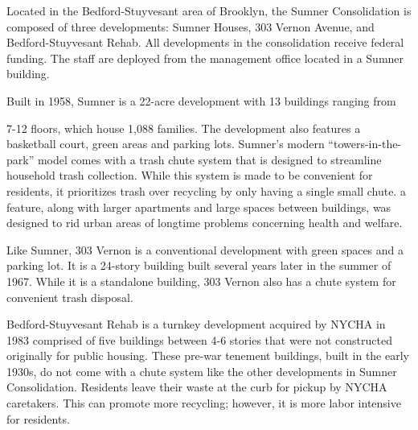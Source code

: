 Located in the Bedford-Stuyvesant area of Brooklyn, the Sumner Consolidation is composed of three developments: Sumner Houses, 303 Vernon Avenue, and Bedford-Stuyvesant Rehab. All developments in the consolidation receive federal funding. The staff are deployed from the management office located in a Sumner building.

 Built in 1958, Sumner is a 22-acre development with 13 buildings ranging from

7-12 floors, which house 1,088 families. The development also features a basketball court, green areas and parking lots. Sumner's modern ``towers-in-the-park'' model comes with a trash chute system that is designed to streamline household trash collection. While this system is made to be convenient for residents, it prioritizes trash over recycling by only having a single small chute. a feature, along with larger apartments and large spaces between buildings, was designed to rid urban areas of longtime problems concerning health and welfare.

Like Sumner, 303 Vernon is a conventional development with green spaces and a parking lot. It is a 24-story building built several years later in the summer of 1967. While it is a standalone building, 303 Vernon also has a chute system for convenient trash disposal.

Bedford-Stuyvesant Rehab is a turnkey development acquired by NYCHA in 1983 comprised of five buildings between 4-6 stories that were not constructed originally for public housing. These pre-war tenement buildings, built in the early 1930s, do not come with a chute system like the other developments in Sumner Consolidation. Residents leave their waste at the curb for pickup by NYCHA caretakers. This can promote more recycling; however, it is more labor intensive for residents.
